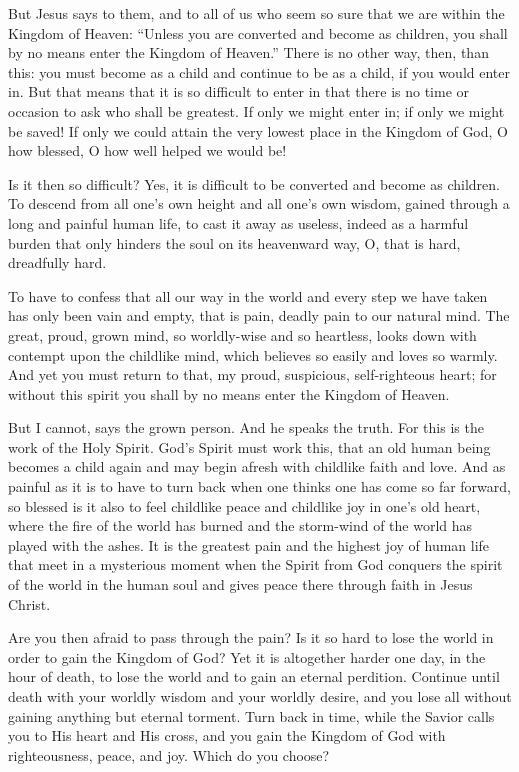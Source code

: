 But Jesus says to them, and to all of us who seem so sure that we are within the Kingdom of Heaven: “Unless you are converted and become as children, you shall by no means enter the Kingdom of Heaven.” There is no other way, then, than this: you must become as a child and continue to be as a child, if you would enter in. But that means that it is so difficult to enter in that there is no time or occasion to ask who shall be greatest. If only we might enter in; if only we might be saved! If only we could attain the very lowest place in the Kingdom of God, O how blessed, O how well helped we would be!

Is it then so difficult? Yes, it is difficult to be converted and become as children. To descend from all one’s own height and all one’s own wisdom, gained through a long and painful human life, to cast it away as useless, indeed as a harmful burden that only hinders the soul on its heavenward way, O, that is hard, dreadfully hard.

To have to confess that all our way in the world and every step we have taken has only been vain and empty, that is pain, deadly pain to our natural mind. The great, proud, grown mind, so worldly-wise and so heartless, looks down with contempt upon the childlike mind, which believes so easily and loves so warmly. And yet you must return to that, my proud, suspicious, self-righteous heart; for without this spirit you shall by no means enter the Kingdom of Heaven.

But I cannot, says the grown person. And he speaks the truth. For this is the work of the Holy Spirit. God’s Spirit must work this, that an old human being becomes a child again and may begin afresh with childlike faith and love. And as painful as it is to have to turn back when one thinks one has come so far forward, so blessed is it also to feel childlike peace and childlike joy in one’s old heart, where the fire of the world has burned and the storm-wind of the world has played with the ashes. It is the greatest pain and the highest joy of human life that meet in a mysterious moment when the Spirit from God conquers the spirit of the world in the human soul and gives peace there through faith in Jesus Christ.

Are you then afraid to pass through the pain? Is it so hard to lose the world in order to gain the Kingdom of God? Yet it is altogether harder one day, in the hour of death, to lose the world and to gain an eternal perdition. Continue until death with your worldly wisdom and your worldly desire, and you lose all without gaining anything but eternal torment. Turn back in time, while the Savior calls you to His heart and His cross, and you gain the Kingdom of God with righteousness, peace, and joy. Which do you choose?

